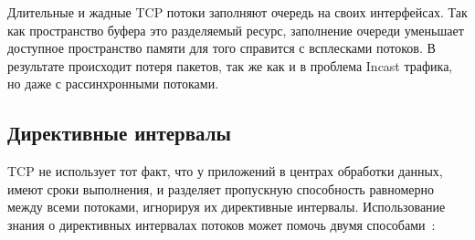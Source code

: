 \documentclass[14pt, a4paper,oneside]{extarticle}
\begin{document}
Длительные и жадные TCP потоки заполняют очередь на своих интерфейсах. Так как пространство буфера это разделяемый ресурс, заполнение очереди уменьшает доступное пространство памяти для того справится с всплесками потоков. В результате происходит потеря пакетов, так же как и в проблема Incast трафика, но даже с рассинхронными потоками.

\subsection{Директивные интервалы}

TCP не использует тот факт, что у приложений в центрах обработки данных, имеют сроки выполнения, и разделяет пропускную способность равномерно между всеми потоками, игнорируя их директивные интервалы. Использование знания о директивных интервалах потоков может помочь двумя способами~\cite{d3tcp}:
\end{document}
